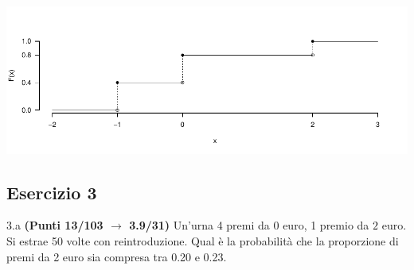 \documentclass[
  11pt,
]{book}
\theoremstyle{mytheoremstyle}
\theoremstyle{mydefstyle}
\newenvironment{sol}
  {
  \begin{tcolorbox}[enhanced,breakable,arc=0.1mm,boxrule=1pt,colback=white,colframe=iblue,
  title=\bf \fontfamily{lmss}\selectfont \hspace{.5 cm} Soluzione,drop fuzzy shadow]

}{
\end{tcolorbox}
  }
\begin{document}
\begin{sol}

\begin{center}\includegraphics{Esami_passati_con_soluzioni_files/figure-latex/2024-88-1} \end{center}

\end{sol}

\subsection{Esercizio 3}\label{esercizio-3-37}

3.a \textbf{(Punti 13/103 \(\rightarrow\) 3.9/31)} Un'urna 4 premi da \(\mbox{0}\) euro, 1 premio da \(\mbox{2}\) euro.
Si estrae 50 volte con reintroduzione.
Qual è la probabilità che la proporzione di premi da 2 euro sia compresa tra 0.20 e 0.23.
\end{document}
